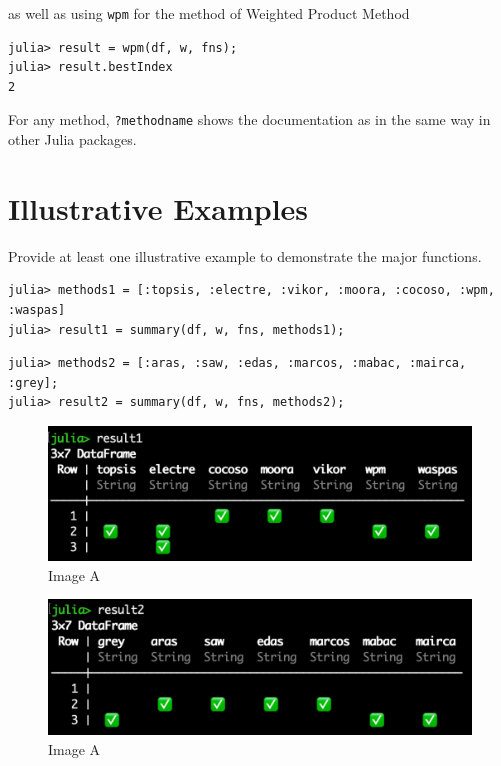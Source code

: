 \documentclass[authoryear,preprint,review,12pt]{elsarticle}
\begin{document}
\noindent as well as using \texttt{wpm} for the method of Weighted Product Method

\begin{verbatim}
julia> result = wpm(df, w, fns);
julia> result.bestIndex
2
\end{verbatim}

For any method, \texttt{?methodname} shows the documentation as in the same way in other Julia packages.

\section{Illustrative Examples}
\label{}
{\color{red}Provide at least one illustrative example to demonstrate the major functions.}

\begin{verbatim}
julia> methods1 = [:topsis, :electre, :vikor, :moora, :cocoso, :wpm, :waspas]
julia> result1 = summary(df, w, fns, methods1);
\end{verbatim}

\begin{verbatim}
julia> methods2 = [:aras, :saw, :edas, :marcos, :mabac, :mairca, :grey];
julia> result2 = summary(df, w, fns, methods2);
\end{verbatim}

\begin{figure}
	\includegraphics[width=\columnwidth]{images/result1}
	\caption{Image A}
	\label{fig:imagea}
	\end{figure}

	\begin{figure}
		\includegraphics[width=\columnwidth]{images/result2}
		\caption{Image A}
		\label{fig:imagea}
		\end{figure}
\end{document}
